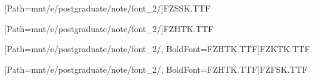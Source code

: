 [Path={mnt/e/postgraduate/note/font_2/}]{FZSSK.TTF}

[Path={mnt/e/postgraduate/note/font_2/}]{FZHTK.TTF}

[Path={mnt/e/postgraduate/note/font_2/}, BoldFont={FZHTK.TTF}]{FZKTK.TTF}

[Path={mnt/e/postgraduate/note/font_2/}, BoldFont={FZHTK.TTF}]{FZFSK.TTF}


\newcommand*{\songti}{\CJKfamily{zhsong}}

\newcommand*{\heiti}{\CJKfamily{zhhei}}

\newcommand*{\kaishu}{\CJKfamily{zhkai}}

\newcommand*{\fangsong}{\CJKfamily{zhfs}}

